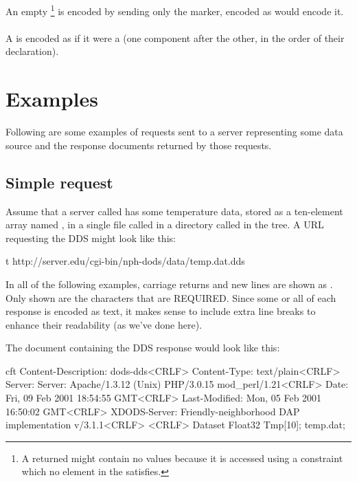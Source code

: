 \documentclass[justify]{nasa-ese}
\begin{document}
An empty \Sequence\footnote{A returned \Sequence might contain no values
  because it is accessed using a constraint which no element in the
  \Sequence satisfies.} is encoded by sending only the 
marker, encoded as  would encode it. 

\paragraph{\Grid}
A \Grid is encoded as if it were a \Structure (one component after the other,
in the order of their declaration).

\section{Examples}

Following are some examples of requests sent to a server representing
some data source and the response documents returned by those
requests.

\subsection{Simple request}

Assume that a server called  has some temperature
data, stored as a ten-element array named , in a single file
called  in a directory called  in the
 tree. A \DAP URL requesting the DDS might look like this:

\begin{vcode}{t}
http://server.edu/cgi-bin/nph-dods/data/temp.dat.dds
\end{vcode}

In all of the following examples, carriage returns and new lines are shown as
. Only shown are the  characters that
are REQUIRED. Since some or all of each response is encoded as text, it makes
sense to include extra line breaks to enhance their readability (as we've
done here).

The document containing the DDS response would look like this:

\begin{vcode}{cft}
Content-Description: dods-dds<CRLF>
Content-Type: text/plain<CRLF>
Server: Server: Apache/1.3.12 (Unix)  PHP/3.0.15 mod_perl/1.21<CRLF>
Date: Fri, 09 Feb 2001 18:54:55 GMT<CRLF>
Last-Modified: Mon, 05 Feb 2001 16:50:02 GMT<CRLF>
XDODS-Server: Friendly-neighborhood DAP implementation v/3.1.1<CRLF>
<CRLF>
Dataset {
  Float32 Tmp[10];
} temp.dat;
\end{vcode}
\end{document}
